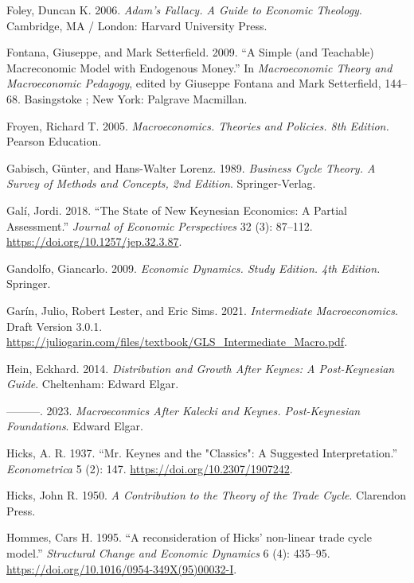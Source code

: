 \documentclass[
  letterpaper,
  DIV=11,
  numbers=noendperiod]{scrreprt}
\newlength{\cslhangindent}
\newenvironment{CSLReferences}[2] %
 {\begin{list}{}{%
  \setlength{\itemindent}{0pt}
  \setlength{\leftmargin}{0pt}
  \setlength{\parsep}{0pt}
  \ifodd #1
   \setlength{\leftmargin}{\cslhangindent}
   \setlength{\itemindent}{-1\cslhangindent}
  \fi
  \setlength{\itemsep}{#2\baselineskip}}}
 {\end{list}}
\begin{document}
\begin{CSLReferences}{1}{0}
Foley, Duncan K. 2006. \emph{Adam's Fallacy. A Guide to Economic
Theology}. Cambridge, MA / London: Harvard University Press.

Fontana, Giuseppe, and Mark Setterfield. 2009. {``A {Simple} (and
{Teachable}) {Macreconomic Model} with {Endogenous Money}.''} In
\emph{Macroeconomic {Theory} and {Macroeconomic Pedagogy}}, edited by
Giuseppe Fontana and Mark Setterfield, 144--68. Basingstoke ; New York:
{Palgrave Macmillan}.

Froyen, Richard T. 2005. \emph{Macroeconomics. Theories and Policies.
8th Edition.} Pearson Education.

Gabisch, Günter, and Hans-Walter Lorenz. 1989. \emph{Business Cycle
Theory. A Survey of Methods and Concepts, 2nd Edition}. Springer-Verlag.

Galí, Jordi. 2018. {``The {State} of {New Keynesian Economics}: {A
Partial Assessment}.''} \emph{Journal of Economic Perspectives} 32 (3):
87--112. \url{https://doi.org/10.1257/jep.32.3.87}.

Gandolfo, Giancarlo. 2009. \emph{Economic Dynamics. Study Edition. 4th
Edition.} Springer.

Garín, Julio, Robert Lester, and Eric Sims. 2021. \emph{Intermediate
Macroeconomics}. Draft Version 3.0.1.
\url{https://juliogarin.com/files/textbook/GLS_Intermediate_Macro.pdf}.

Hein, Eckhard. 2014. \emph{Distribution and {Growth After Keynes}: {A
Post}-{Keynesian Guide}}. Cheltenham: {Edward Elgar}.

---------. 2023. \emph{Macroeconmics After Kalecki and Keynes.
Post-Keynesian Foundations}. Edward Elgar.

Hicks, A. R. 1937. {``{Mr. Keynes and the "Classics": A Suggested
Interpretation}.''} \emph{Econometrica} 5 (2): 147.
\url{https://doi.org/10.2307/1907242}.

Hicks, John R. 1950. \emph{A Contribution to the Theory of the Trade
Cycle}. Clarendon Press.

Hommes, Cars H. 1995. {``{A reconsideration of Hicks' non-linear trade
cycle model}.''} \emph{Structural Change and Economic Dynamics} 6 (4):
435--95. \url{https://doi.org/10.1016/0954-349X(95)00032-I}.


\end{CSLReferences}
\end{document}
